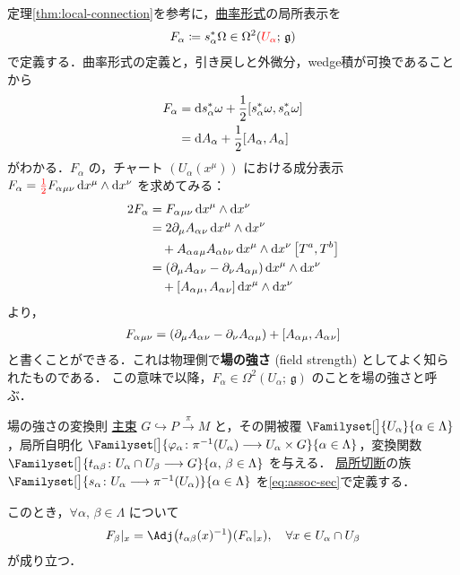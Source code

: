 \documentclass[TQFT_main]{subfiles}
\begin{document}
定理\ref{thm:local-connection}を参考に，\hyperref[def:curvature]{曲率形式}の局所表示を
\begin{align}
    \label{def:field-strength}
    F_\alpha \coloneqq s_\alpha^* \Omega \in \Omega^2 (\textcolor{red}{U_\alpha};\, \mathfrak{g})
\end{align}
で定義する．曲率形式の定義と，引き戻しと外微分，wedge積が可換であることから
\begin{align}
    F_\alpha 
    &= \dd s_\alpha^* \omega + \frac{1}{2} \comm{s_\alpha^* \omega}{s_\alpha^* \omega} \\
    &= \dd{A_\alpha} + \frac{1}{2} \comm{A_\alpha}{A_\alpha}
\end{align}
がわかる．$F_\alpha$ の，チャート $(U_\alpha (x^\mu))$ における成分表示 $F_\alpha = \textcolor{red}{\frac{1}{2}} F_\alpha{}_{\mu\nu} \dd{x^\mu} \wedge \dd{x^\nu}$ を求めてみる：
\begin{align}
    2F_\alpha
    &= F_\alpha{}_{\mu\nu} \dd{x^\mu} \wedge \dd{x^\nu} \\
    &= 2\partial_\mu A_\alpha{}_\nu \dd{x^\mu} \wedge \dd{x^\nu}  \\
    &\quad + A_\alpha{}_a{}_{\mu} A_\alpha{}_b{}_\nu \dd{x^\mu} \wedge \dd{x^\nu} \comm{T^a}{T^b} \\
    &= (\partial_\mu A_\alpha{}_\nu - \partial_\nu A_\alpha{}_\mu) \dd{x^\mu} \wedge \dd{x^\nu} \\
    &\quad + \comm{A_\alpha{}_\mu}{A_\alpha{}_\nu} \dd{x^\mu} \wedge \dd{x^\nu}
\end{align}
より，
\begin{align}
    F_\alpha{}_{\mu\nu} = (\partial_\mu A_\alpha{}_\nu - \partial_\nu A_\alpha{}_\mu) + \comm{A_\alpha{}_\mu}{A_\alpha{}_\nu} 
\end{align}
と書くことができる．これは物理側で\textbf{場の強さ} (field strength) としてよく知られたものである．
この意味で以降，$F_\alpha \in \Omega^2(U_\alpha;\, \mathfrak{g})$ のことを場の強さと呼ぶ．

\begin{mytheo}[label=thm:curvature-local]{場の強さの変換則}
    \hyperref[def.PFD]{主束} $G \hookrightarrow P \xrightarrow{\pi} M$ と，その開被覆 $\Familyset[\big]{U_\alpha}{\alpha \in \Lambda}$，局所自明化 $\Familyset[\big]{\varphi_\alpha \colon \pi^{-1}(U_\alpha) \lto U_\alpha \times G}{\alpha \in \Lambda}$，変換関数 $\Familyset[\big]{t_{\alpha\beta} \colon U_\alpha \cap U_\beta \lto G}{\alpha,\, \beta \in \Lambda}$ を与える．
    \hyperref[def.section]{局所切断}の族 $\Familyset[\big]{s_\alpha \colon U_\alpha \lto \pi^{-1}(U_\alpha)}{\alpha \in \Lambda}$ を\eqref{eq:assoc-sec}で定義する． 
    
    このとき，$\forall \alpha,\, \beta \in \Lambda$ について
    \begin{align}
        F_{\beta}|_x = \Adj \bigl( t_{\alpha\beta}(x)^{-1} \bigr)(F_\alpha|_x),\quad \forall x \in U_\alpha \cap U_\beta
    \end{align}
    が成り立つ．
\end{mytheo}
\end{document}
